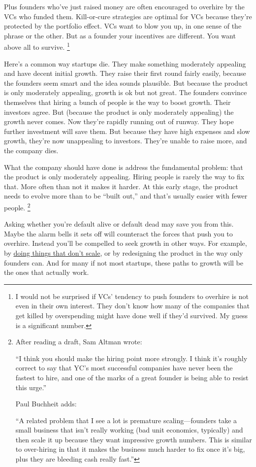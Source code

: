 \documentclass[12pt]{book}
\begin{document}
Plus founders who've just raised money are often encouraged to overhire
by the VCs who funded them. Kill-or-cure strategies are optimal for VCs
because they're protected by the portfolio effect. VCs want to blow you
up, in one sense of the phrase or the other. But as a founder your
incentives are different. You want above all to survive.
\footnote{I would not be surprised if VCs' tendency to push founders to
overhire is not even in their own interest. They don't know how many of
the companies that get killed by overspending might have done well if
they'd survived. My guess is a significant number.}

Here's a common way startups die. They make something moderately
appealing and have decent initial growth. They raise their first round
fairly easily, because the founders seem smart and the idea sounds
plausible. But because the product is only moderately appealing, growth
is ok but not great. The founders convince themselves that hiring a
bunch of people is the way to boost growth. Their investors agree. But
(because the product is only moderately appealing) the growth never
comes. Now they're rapidly running out of runway. They hope further
investment will save them. But because they have high expenses and slow
growth, they're now unappealing to investors. They're unable to raise
more, and the company dies.

What the company should have done is address the fundamental problem:
that the product is only moderately appealing. Hiring people is rarely
the way to fix that. More often than not it makes it harder. At this
early stage, the product needs to evolve more than to be ``built out,''
and that's usually easier with fewer people. \footnote{After reading a draft, Sam Altman wrote:

``I think you should make the hiring point more strongly. I think it's
roughly correct to say that YC's most successful companies have never
been the fastest to hire, and one of the marks of a great founder is
being able to resist this urge.''

Paul Buchheit adds:

``A related problem that I see a lot is premature scaling---founders
take a small business that isn't really working (bad unit economics,
typically) and then scale it up because they want impressive growth
numbers. This is similar to over-hiring in that it makes the business
much harder to fix once it's big, plus they are bleeding cash really
fast.''}

Asking whether you're default alive or default dead may save you from
this. Maybe the alarm bells it sets off will counteract the forces that
push you to overhire. Instead you'll be compelled to seek growth in
other ways. For example, by \href{ds.html}{doing things that don't
scale}, or by redesigning the product in the way only founders can. And
for many if not most startups, these paths to growth will be the ones
that actually work.
\end{document}
